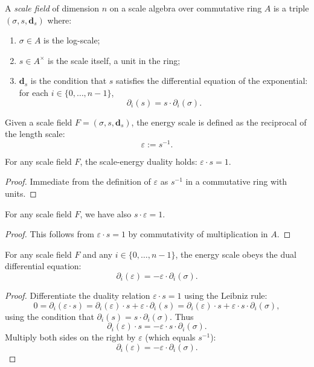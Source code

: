 \begin{definition}
A \emph{scale field} of dimension $n$ on a scale algebra over commutative ring $A$ is a triple $(\sigma, s, \mathbf{d}_s)$ where:
\begin{enumerate}
\item $\sigma \in A$ is the log-scale;
\item $s \in A^\times$ is the scale itself, a unit in the ring;
\item $\mathbf{d}_s$ is the condition that $s$ satisfies the differential equation of the exponential: for each $i \in \{0,\ldots,n-1\}$,
  $$\partial_i(s) = s \cdot \partial_i(\sigma).$$
\end{enumerate}
\end{definition}

\begin{definition}
Given a scale field $F = (\sigma, s, \mathbf{d}_s)$, the energy scale is defined as the reciprocal of the length scale:
$$\varepsilon := s^{-1}.$$
\end{definition}

\begin{theorem}
For any scale field $F$, the scale-energy duality holds: $\varepsilon \cdot s = 1$.
\end{theorem}
\begin{proof}
Immediate from the definition of $\varepsilon$ as $s^{-1}$ in a commutative ring with units.
\end{proof}

\begin{theorem}
For any scale field $F$, we have also $s \cdot \varepsilon = 1$.
\end{theorem}
\begin{proof}
This follows from $\varepsilon \cdot s = 1$ by commutativity of multiplication in $A$.
\end{proof}

\begin{theorem}
For any scale field $F$ and any $i \in \{0,\ldots,n-1\}$, the energy scale obeys the dual differential equation:
$$\partial_i(\varepsilon) = -\varepsilon \cdot \partial_i(\sigma).$$
\end{theorem}
\begin{proof}
Differentiate the duality relation $\varepsilon \cdot s = 1$ using the Leibniz rule:
$$0 = \partial_i(\varepsilon \cdot s) = \partial_i(\varepsilon) \cdot s + \varepsilon \cdot \partial_i(s) = \partial_i(\varepsilon) \cdot s + \varepsilon \cdot s \cdot \partial_i(\sigma),$$
using the condition that $\partial_i(s) = s \cdot \partial_i(\sigma)$. Thus
$$\partial_i(\varepsilon) \cdot s = -\varepsilon \cdot s \cdot \partial_i(\sigma).$$
Multiply both sides on the right by $\varepsilon$ (which equals $s^{-1}$):
$$\partial_i(\varepsilon) = -\varepsilon \cdot \partial_i(\sigma).$$
\end{proof}

